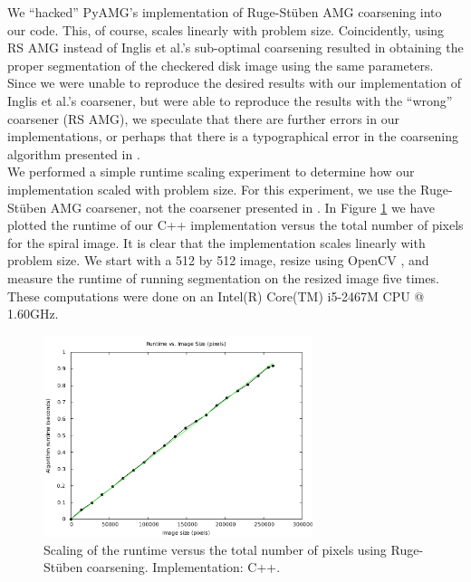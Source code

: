 \documentclass[12pt]{article}%
\begin{document}
We ``hacked'' PyAMG's implementation \cite{pyamg:2011} of Ruge-St\"uben AMG coarsening into our code.  This, of course, scales linearly with problem size.  Coincidently, using RS AMG instead of Inglis et al.'s sub-optimal coarsening resulted in obtaining the proper segmentation of the checkered disk image using the same parameters.  Since we were unable to reproduce the desired results with our implementation of Inglis et al.'s coarsener, but were able to reproduce the results with the ``wrong'' coarsener (RS AMG), we speculate that there are further errors in our implementations, or perhaps that there is a typographical error in the coarsening algorithm presented in \cite{inglis:2010}.\\

We performed a simple runtime scaling experiment to determine how our implementation scaled with problem size.  For this experiment, we use the Ruge-St\"uben AMG coarsener, not the coarsener presented in \cite{inglis:2010}.  In Figure \ref{fig:runtime_scaling} we have plotted the runtime of our C++ implementation versus the total number of pixels for the spiral image.  It is clear that the implementation scales linearly with problem size.  We start with a 512 by 512 image, resize using OpenCV \cite{opencv:2000}, and measure the runtime of running segmentation on the resized image five times.  These computations were done on an Intel(R) Core(TM) i5-2467M CPU @ 1.60GHz.\\


\begin{figure}[ht]
   \centering
   \includegraphics[width=0.7\textwidth]{runtime_scaling_RSAMG_spiral_512_james.pdf}
   \caption{Scaling of the runtime versus the total number of pixels using Ruge-St\"uben coarsening.  Implementation: C++.}
   \label{fig:runtime_scaling}
\end{figure}
\end{document}
